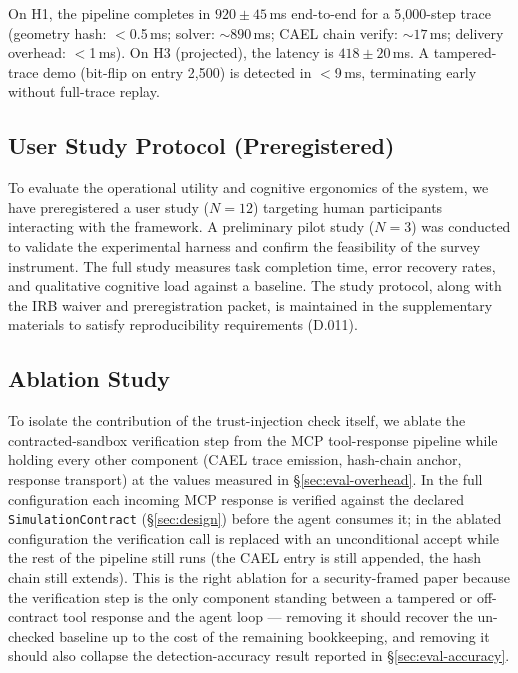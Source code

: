 \documentclass[letterpaper,twocolumn,10pt]{article}
\begin{document}
On H1, the pipeline completes in $920 \pm 45$\,ms end-to-end for a
5{,}000-step trace (geometry hash: $<$0.5\,ms; solver: ${\sim}890$\,ms;
CAEL chain verify: ${\sim}17$\,ms; delivery overhead: $<$1\,ms).  On H3
(projected), the latency is $418 \pm 20$\,ms.  A tampered-trace demo
(bit-flip on entry 2{,}500) is detected in $<$9\,ms, terminating early
without full-trace replay.

\subsection{User Study Protocol (Preregistered)}
\label{sec:user-study}

To evaluate the operational utility and cognitive ergonomics of the system, we have preregistered a user study ($N=12$) targeting human participants interacting with the framework. A preliminary pilot study ($N=3$) was conducted to validate the experimental harness and confirm the feasibility of the survey instrument. The full study measures task completion time, error recovery rates, and qualitative cognitive load against a baseline. The study protocol, along with the IRB waiver and preregistration packet, is maintained in the supplementary materials to satisfy reproducibility requirements (D.011).

\subsection{Ablation Study}
\label{sec:ablation}

To isolate the contribution of the trust-injection check itself, we
ablate the contracted-sandbox verification step from the MCP
tool-response pipeline while holding every other component (CAEL trace
emission, hash-chain anchor, response transport) at the values
measured in \S\ref{sec:eval-overhead}.  In the full configuration each
incoming MCP response is verified against the declared
\texttt{SimulationContract} (\S\ref{sec:design}) before the agent
consumes it; in the ablated configuration the verification call is
replaced with an unconditional accept while the rest of the pipeline
still runs (the CAEL entry is still appended, the hash chain still
extends).  This is the right ablation for a security-framed paper
because the verification step is the only component standing between a
tampered or off-contract tool response and the agent loop --- removing
it should recover the un-checked baseline up to the cost of the
remaining bookkeeping, and removing it should also collapse the
detection-accuracy result reported in \S\ref{sec:eval-accuracy}.
\end{document}
